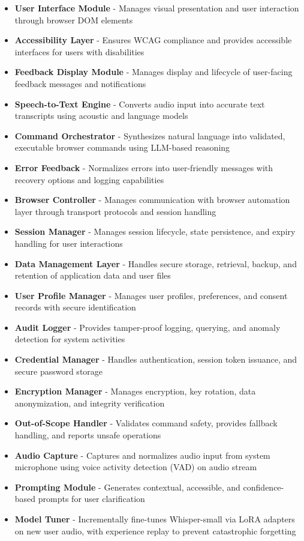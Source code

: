 \documentclass[12pt, titlepage]{article}
\begin{document}
\begin{itemize}
  \item \textbf{User Interface Module} - Manages visual presentation and user interaction through browser DOM elements
  \item \textbf{Accessibility Layer} - Ensures WCAG compliance and provides accessible interfaces for users with disabilities
  \item \textbf{Feedback Display Module} - Manages display and lifecycle of user-facing feedback messages and notifications
  \item \textbf{Speech-to-Text Engine} - Converts audio input into accurate text transcripts using acoustic and language models
  \item \textbf{Command Orchestrator} - Synthesizes natural language into validated, executable browser commands using LLM-based reasoning
  \item \textbf{Error Feedback} - Normalizes errors into user-friendly messages with recovery options and logging capabilities
  \item \textbf{Browser Controller} - Manages communication with browser automation layer through transport protocols and session handling
  \item \textbf{Session Manager} - Manages session lifecycle, state persistence, and expiry handling for user interactions
  \item \textbf{Data Management Layer} - Handles secure storage, retrieval, backup, and retention of application data and user files
  \item \textbf{User Profile Manager} - Manages user profiles, preferences, and consent records with secure identification
  \item \textbf{Audit Logger} - Provides tamper-proof logging, querying, and anomaly detection for system activities
  \item \textbf{Credential Manager} - Handles authentication, session token issuance, and secure password storage
  \item \textbf{Encryption Manager} - Manages encryption, key rotation, data anonymization, and integrity verification
  \item \textbf{Out-of-Scope Handler} - Validates command safety, provides fallback handling, and reports unsafe operations
  \item \textbf{Audio Capture} - Captures and normalizes audio input from system microphone using voice activity detection (VAD) on audio stream
  \item \textbf{Prompting Module} - Generates contextual, accessible, and confidence-based prompts for user clarification
  \item \textbf{Model Tuner} - Incrementally fine-tunes Whisper-small via LoRA adapters on new user audio, with experience replay to prevent catastrophic forgetting
\end{itemize}
\end{document}

